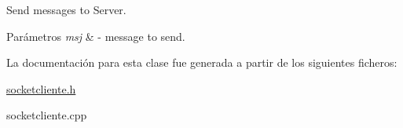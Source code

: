 Send messages to Server. 


\begin{DoxyParams}{Parámetros}
{\em msj} & -\/ message to send. \\
\hline
\end{DoxyParams}


La documentación para esta clase fue generada a partir de los siguientes ficheros\+:\begin{DoxyCompactItemize}
\item 
\hyperlink{socketcliente_8h}{socketcliente.\+h}\item 
socketcliente.\+cpp\end{DoxyCompactItemize}

